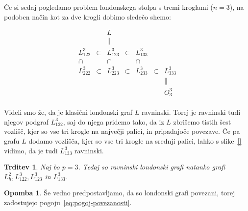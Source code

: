\documentclass[12pt,a4paper]{amsart}
\theoremstyle{definition} %
\newtheorem{opomba}[definicija]{Opomba}
\theoremstyle{plain} %
\newtheorem{trditev}[definicija]{Trditev}
\begin{document}
Če si sedaj pogledamo problem londonskega stolpa s tremi kroglami ($n=3$), na podoben način kot za dve krogli dobimo sledečo shemo:

\begin{equation}
\label{eq:grafi-3krogle}
\begin{matrix}
    & & L & & & & \\
    & & \parallel & & & & \\
    L_{122}^3 & \subset & L_{123}^3 & \subset & L_{133}^3 & & \\
    \cap & & \cap & & \cap & & \\
    L_{222}^3 & \subset & L_{223}^3 & \subset & L_{233}^3 & \subset & L_{333}^3 \\
    & & & & & & \parallel \\
    & & & & & & O^3_3 \\
\end{matrix}
\end{equation}

\smallskip

Videli smo že, da je klasični londonski graf $L$ ravninski. Torej je ravninski tudi njegov podgraf $L_{122}^3$, saj do njega pridemo tako, da iz $L$ zbrišemo tistih šest vozlišč, kjer so vse tri krogle na največji palici, in pripadajoče povezave. 
Če pa grafu $L$ dodamo vozlišča, kjer so vse tri krogle na srednji palici, lahko s slike~\ref{} vidimo, da je tudi $L_{133}^3$ ravninski.

\begin{trditev}
    Naj bo $p=3$. Tedaj so ravninski londonski grafi natanko grafi $L_h^2, L_{122}^3, L_{123}^3$ in $L_{133}^3$.
\end{trditev}

\begin{opomba}
    Še vedno predpostavljamo, da so londonski grafi povezani, torej zadostujejo pogoju~\eqref{eq:pogoj-povezanosti}.
\end{opomba}
\end{document}
